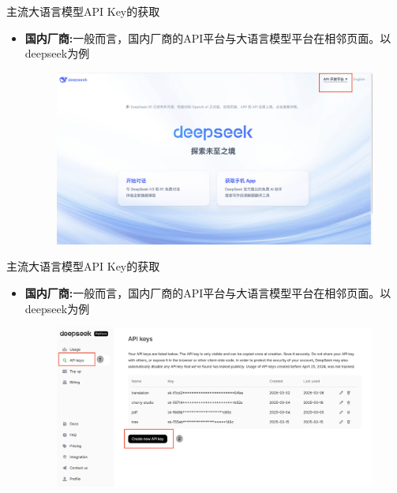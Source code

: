 \documentclass{beamer}
\begin{document}
\begin{frame}{主流大语言模型API Key的获取}
    \begin{itemize}
        \item  \textbf{国内厂商:}一般而言，国内厂商的API平台与大语言模型平台在相邻页面。以deepseek为例
        	\begin{figure}[htpb]
        	\centering
        	\includegraphics[width=1\linewidth]{figs/API1.png}
        \end{figure}
   
      \end{itemize}
\end{frame}
\begin{frame}{主流大语言模型API Key的获取}
	\begin{itemize}
		\item  \textbf{国内厂商:}一般而言，国内厂商的API平台与大语言模型平台在相邻页面。以deepseek为例
		\begin{figure}[htpb]
			\centering
			\includegraphics[width=1\linewidth]{figs/API2.png}
		\end{figure}
		
	\end{itemize}
\end{frame}
\end{document}
